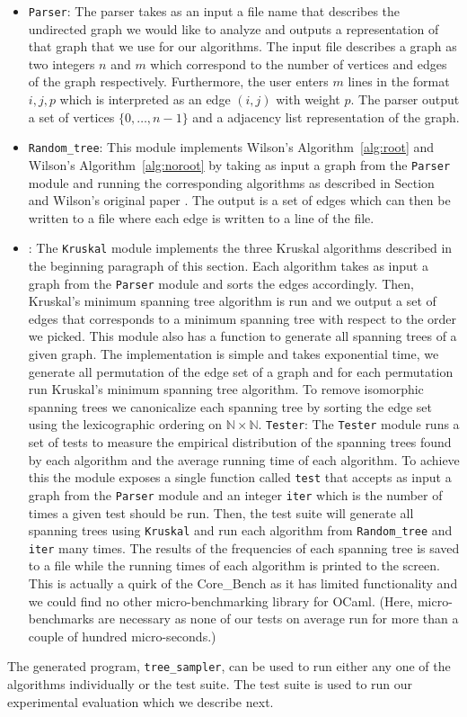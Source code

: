 \documentclass[11pt]{article}
\begin{document}
\begin{itemize}
\item \texttt{Parser}: The parser takes as an input a file name that describes the undirected graph we would like to analyze and outputs a representation of that graph that we use for our algorithms. The input file describes a graph as two integers $n$ and $m$ which correspond to the number of vertices and edges of the graph respectively. Furthermore, the user enters $m$ lines in the format $i,j,p$ which is interpreted as an edge $(i,j)$ with weight $p$. The parser output a set of vertices $\{0,\dots,n-1\}$ and a adjacency list representation of the graph.
\item \texttt{Random\_tree}: This module implements Wilson's Algorithm~\ref{alg:root} and Wilson's Algorithm~\ref{alg:noroot} by taking as input a graph from the \texttt{Parser} module and running the corresponding algorithms as described in Section~\label{wilson} and Wilson's original paper \cite{wilson}. The output is a set of edges which can then be written to a file where each edge is written to a line of the file.
\item {}: The \texttt{Kruskal} module implements the three Kruskal algorithms described in the beginning paragraph of this section. Each algorithm takes as input a graph from the \texttt{Parser} module and sorts the edges accordingly. Then, Kruskal's minimum spanning tree algorithm is run and we output a set of edges that corresponds to a minimum spanning tree with respect to the order we picked. This module also has a function to generate all spanning trees of a given graph. The implementation is simple and takes exponential time, we generate all permutation of the edge set of a graph and for each permutation run Kruskal's minimum spanning tree algorithm. To remove isomorphic spanning trees we canonicalize each spanning tree by sorting the edge set using the lexicographic ordering on $\mathbb{N}\times\mathbb{N}$.
\tem \texttt{Tester}: The \texttt{Tester} module runs a set of tests to measure the empirical distribution of the spanning trees found by each algorithm and the average running time of each algorithm. To achieve this the module exposes a single function called \texttt{test} that accepts as input a graph from the \texttt{Parser} module and an integer \texttt{iter} which is the number of times a given test should be run. Then, the test suite will generate all spanning trees using \texttt{Kruskal} and run each algorithm from \texttt{Random\_tree} and  \texttt{iter} many times. The results of the frequencies of each spanning tree is saved to a file while the running times of each algorithm is printed to the screen. This is actually a quirk of the Core\_Bench as it has limited functionality and we could find no other micro-benchmarking library for OCaml. (Here, micro-benchmarks are necessary as none of our tests on average run for more than a couple of hundred micro-seconds.)
\end{itemize}

The generated program, \texttt{tree_sampler}, can be used to run either any one of the algorithms individually or the test suite. The test suite is used to run our experimental evaluation which we describe next.

\printbibliography
\end{document}

